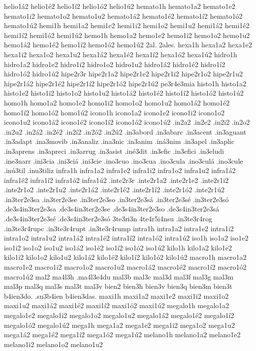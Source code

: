 {helio1á2 helio1é2 helio1í2 helio1ó2 helio1ú2
hemato1h
hemato1a2 hemato1e2 hemato1i2 hemato1o2 hemato1u2
hemato1á2 hemato1é2 hemato1í2 hemato1ó2 hemato1ú2
hemi1h
hemi1a2 hemi1e2 hemi1i2 hemi1o2 hemi1u2
hemi1á2 hemi1é2 hemi1í2 hemi1ó2 hemi1ú2
hemo1h
hemo1a2 hemo1e2 hemo1i2 hemo1o2 hemo1u2
hemo1á2 hemo1é2 hemo1í2 hemo1ó2 hemo1ú2
2al.
2ales.
hexa1h
hexa1a2 hexa1e2 hexa1i2 hexa1o2 hexa1u2
hexa1á2 hexa1é2 hexa1í2 hexa1ó2 hexa1ú2
hidro1h
hidro1a2 hidro1e2 hidro1i2 hidro1o2 hidro1u2
hidro1á2 hidro1é2 hidro1í2 hidro1ó2 hidro1ú2
hipe2r3r
hipe2r1a2 hipe2r1e2 hipe2r1i2 hipe2r1o2 hipe2r1u2
hipe2r1á2 hipe2r1é2 hipe2r1í2 hipe2r1ó2 hipe2r1ú2
pe3r4e3mia
histo1h
histo1a2 histo1e2 histo1i2 histo1o2 histo1u2
histo1á2 histo1é2 histo1í2 histo1ó2 histo1ú2
homo1h
homo1a2 homo1e2 homo1i2 homo1o2 homo1u2
homo1á2 homo1é2 homo1í2 homo1ó2 homo1ú2
icono1h
icono1a2 icono1e2 icono1i2 icono1o2 icono1u2
icono1á2 icono1é2 icono1í2 icono1ó2 icono1ú2
.in2a2
.in2e2
.in2i2
.in2o2
.in2u2
.in2á2
.in2é2
.in2í2
.in2ó2
.in2ú2
.in3abord
.in3abarc
.in3acent
.in3aguant
.in3adapt
.ina3movib
.in3analiz
.ina3nic
.in3anim
.iná3nim
.in3apel
.in3aplic
.in3aprens
.in3apreci
.in3arrug
.in3asist
.iné3dit
.in3efic
.in3efici
.in3eludi
.ine3narr
.ini3cia
.ini3ciá
.ini3cie
.ino3cuo
.ino3cua
.ino3cula
.ino3culá
.ino3cule
.inú3til
.inu3tiliz
infra1h
infra1a2 infra1e2 infra1i2 infra1o2 infra1u2
infra1á2 infra1é2 infra1í2 infra1ó2 infra1ú2
.inte2r3r
.inte2r1a2 .inte2r1e2 .inte2r1i2 .inte2r1o2 .inte2r1u2
.inte2r1á2 .inte2r1é2 .inte2r1í2 .inte2r1ó2 .inte2r1ú2
.in3ter2e3sa
.in3ter2e3se
.in3ter2e3so
.in3ter2e3sá
.in3ter2e3sé
.in3ter2e3só
.de3s4in3ter2e3sa
.de3s4in3ter2e3se
.de3s4in3ter2e3so
.de3s4in3ter2e3sá
.de3s4in3ter2e3sé
.de3s4in3ter2e3só
3te3ri3n
4te4r5i4nsu
.in3te3r4rog
.in3te3r4rupc
.in3te3r4rupt
.in3te3r4rump
intra1h
intra1a2 intra1e2 intra1i2 intra1o2 intra1u2
intra1á2 intra1é2 intra1í2 intra1ó2 intra1ú2
iso1h
iso1a2 iso1e2 iso1i2 iso1o2 iso1u2
iso1á2 iso1é2 iso1í2 iso1ó2 iso1ú2
kilo1h
kilo1a2 kilo1e2 kilo1i2 kilo1o2 kilo1u2
kilo1á2 kilo1é2 kilo1í2 kilo1ó2 kilo1ú2
macro1h
macro1a2 macro1e2 macro1i2 macro1o2 macro1u2
macro1á2 macro1é2 macro1í2 macro1ó2 macro1ú2
mal2
ma4l3h
.ma4l3e4du
mal3b
mal3c
mal3d
mal3f
mal3g
mal3m
mal3p
mal3q
mal3s
mal3t
mal3v
bien2
bien3h
bien3v
bien3q
bien3m
bien3t
b4ien3do.
.su3b4ien
b4ien3das.
maxi1h
maxi1a2 maxi1e2 maxi1i2 maxi1o2 maxi1u2
maxi1á2 maxi1é2 maxi1í2 maxi1ó2 maxi1ú2
megalo1h
megalo1a2 megalo1e2 megalo1i2 megalo1o2 megalo1u2
megalo1á2 megalo1é2 megalo1í2 megalo1ó2 megalo1ú2
mega1h
mega1a2 mega1e2 mega1i2 mega1o2 mega1u2
mega1á2 mega1é2 mega1í2 mega1ó2 mega1ú2
melano1h
melano1a2 melano1e2 melano1i2 melano1o2 melano1u2
}
